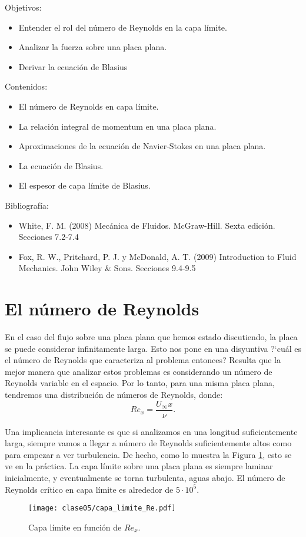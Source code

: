 \begin{framed}

Objetivos:
\begin{itemize}
    \item Entender el rol del número de Reynolds en la capa límite.
    \item Analizar la fuerza sobre una placa plana.
    \item Derivar la ecuación de Blasius
\end{itemize}

Contenidos:
\begin{itemize}
    \item El número de Reynolds en capa límite.
    \item La relación integral de momentum en una placa plana.
    \item Aproximaciones de la ecuación de Navier-Stokes en una placa plana.
    \item La ecuación de Blasius.
    \item El espesor de capa límite de Blasius.
\end{itemize}

Bibliografía:
\begin{itemize}
    \item White, F. M. (2008) Mecánica de Fluidos. McGraw-Hill. Sexta edición. Secciones 7.2-7.4
    \item Fox, R. W., Pritchard, P. J. y McDonald, A. T. (2009) Introduction to Fluid Mechanics. John Wiley \& Sons. Secciones 9.4-9.5
\end{itemize}
\end{framed}

\section*{El número de Reynolds}

En el caso del flujo sobre una placa plana que hemos estado discutiendo, la placa se puede considerar infinitamente larga.
Esto nos pone en una disyuntiva \mbox{?`}cuál es el número de Reynolds que caracteriza al problema entonces?
Resulta que la mejor manera que analizar estos problemas es considerando un número de Reynolds variable en el espacio.
Por lo tanto, para una misma placa plana, tendremos una distribución de números de Reynolds, donde:
%
\begin{equation}\label{eq:Re_capa}
Re_x = \frac{U_\infty x}{\nu}.
\end{equation}

Una implicancia interesante es que si analizamos en una longitud suficientemente larga, siempre vamos a llegar a número de Reynolds suficientemente altos como para empezar a ver turbulencia.
De hecho, como lo muestra la Figura \ref{fig:capa_limite_Re}, esto se ve en la práctica. 
La capa límite sobre una placa plana es siempre laminar inicialmente, y eventualmente se torna turbulenta, aguas abajo.
El número de Reynolds crítico en capa límite es alrededor de $5\cdot10^{5}$.
%
\begin{figure}[!h]
\centering
\texttt{[image: clase05/capa\_limite\_Re.pdf]}
\caption{Capa límite en función de $Re_x$.}
\label{fig:capa_limite_Re}
\end{figure}

